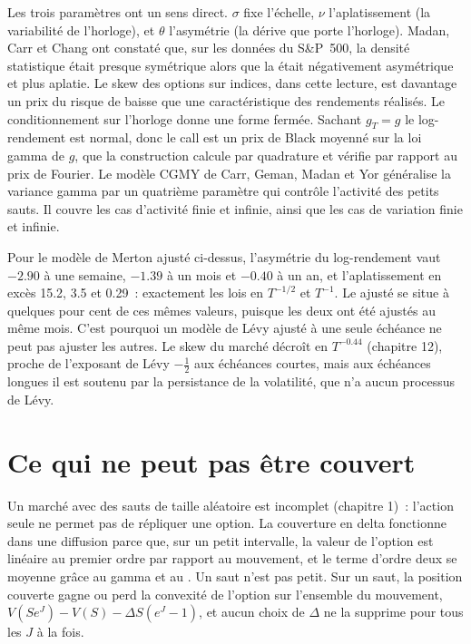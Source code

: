 Les trois paramètres ont un sens direct. $\sigma$ fixe l'échelle, $\nu$ l'aplatissement (la variabilité
de l'horloge), et $\theta$ l'asymétrie (la dérive que porte l'horloge). Madan, Carr et Chang ont constaté que, sur les données du
S\&P~500, la densité statistique était presque symétrique alors que la  était négativement asymétrique
et plus aplatie. Le skew des options sur indices, dans cette lecture, est davantage un prix du risque de baisse que
une caractéristique des rendements réalisés. Le conditionnement sur l'horloge donne une forme fermée. Sachant $g_T=g$ le log-rendement est
normal, donc le call est un prix de Black moyenné sur la loi gamma de $g$, que la construction calcule par quadrature
et vérifie par rapport au prix de Fourier. Le modèle CGMY de Carr, Geman, Madan et Yor généralise la variance gamma
par un quatrième paramètre qui contrôle l'activité des petits sauts. Il couvre les cas d'activité finie et infinie,
ainsi que les cas de variation finie et infinie.

\begin{example}\label{ex:dv:jumps-and-levy-models:moments}
Pour le modèle de Merton ajusté ci-dessus, l'asymétrie du log-rendement vaut $-2.90$ à une semaine, $-1.39$ à un mois
et $-0.40$ à un an, et l'aplatissement en excès 15.2, 3.5 et 0.29~: exactement les lois en $T^{-1/2}$ et $T^{-1}$. Le
 ajusté se situe à quelques pour cent de ces mêmes valeurs, puisque les deux ont été ajustés au même
mois. C'est pourquoi un modèle de Lévy ajusté à une seule échéance ne peut pas ajuster les autres. Le skew du marché décroît
en $T^{-0.44}$ (chapitre 12), proche de l'exposant de Lévy $-\frac12$ aux échéances courtes, mais aux échéances longues il
est soutenu par la persistance de la volatilité, que n'a aucun processus de Lévy.
\end{example}

\section{Ce qui ne peut pas être couvert}

Un marché avec des sauts de taille aléatoire est incomplet (chapitre 1)~: l'action seule ne permet pas de répliquer une option.
La couverture en delta fonctionne dans une diffusion parce que, sur un petit intervalle, la valeur de l'option est linéaire
au premier ordre par rapport au mouvement, et le terme d'ordre deux se moyenne grâce au gamma et au . Un saut n'est pas petit. Sur un
saut, la position couverte gagne ou perd la convexité de l'option sur l'ensemble du mouvement,
$V(Se^J)-V(S)-\Delta S(e^J-1)$, et aucun choix de $\Delta$ ne la supprime pour tous les $J$ à la fois.

